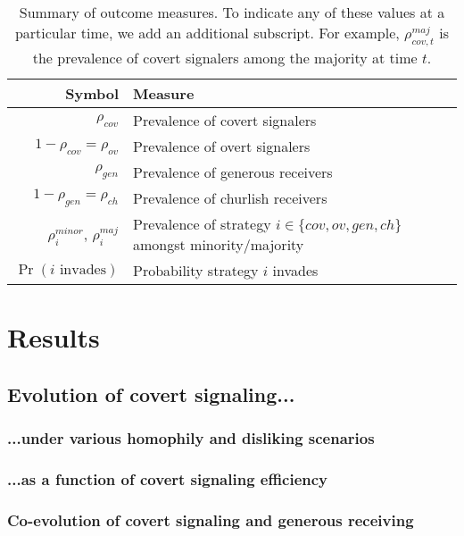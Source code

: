 \documentclass[11pt,letterpaper]{article}
\begin{document}
\begin{table}[H]
  \centering
  \begin{tabular}{rp{3in}} %
    Symbol & Measure \\ %
    \toprule
      $\rho_{cov}$ & Prevalence of covert signalers\\
    $1 - \rho_{cov} = \rho_{ov}$ & Prevalence of overt signalers  \\
     $\rho_{gen}$ & Prevalence of generous receivers \\
    $1 - \rho_{gen} = \rho_{ch}$ & Prevalence of churlish receivers \\
    $\rho_i^{minor}$, $\rho_i^{maj}$ & Prevalence of strategy $i \in \{cov, ov, gen, ch\}$ amongst minority/majority \\
    $\Pr(\text{$i$ invades})$ & Probability strategy $i$ invades 
  \end{tabular}
  \caption{Summary of outcome measures. To indicate any of these values at
  a particular time, we add an additional subscript. For example, $\rho_{cov,t}^{maj}$
  is the prevalence of covert signalers among the majority at time $t$.}
  \label{tab:outcomeMeasures}
\end{table}





\section{Results}

\subsection{Evolution of covert signaling...}

\subsubsection{...under various homophily and disliking scenarios}

\subsubsection{...as a function of covert signaling efficiency}

\subsubsection{Co-evolution of covert signaling and generous receiving}
\end{document}
